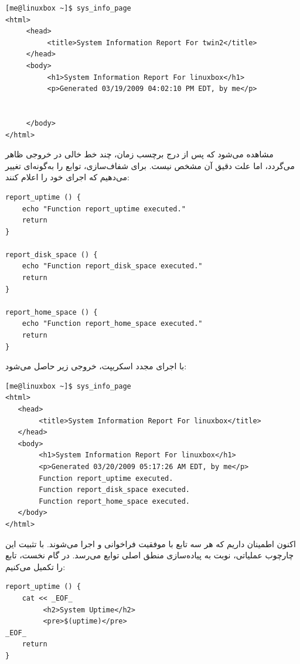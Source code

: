 \begin{latin}
\begin{lstlisting}
[me@linuxbox ~]$ sys_info_page
<html>
     <head>
          <title>System Information Report For twin2</title>
     </head>
     <body>
          <h1>System Information Report For linuxbox</h1>
          <p>Generated 03/19/2009 04:02:10 PM EDT, by me</p>


     </body>
</html>
\end{lstlisting}
\end{latin}

مشاهده می‌شود که پس از درج برچسب زمان، چند خط خالی در خروجی ظاهر می‌گردد، اما علت دقیق آن مشخص نیست. برای شفاف‌سازی، توابع را به‌گونه‌ای تغییر می‌دهیم که اجرای خود را اعلام کنند:

\begin{latin}
\begin{lstlisting}
report_uptime () {
    echo "Function report_uptime executed."
    return
}

report_disk_space () {
    echo "Function report_disk_space executed."
    return
}

report_home_space () {
    echo "Function report_home_space executed."
    return
}
\end{lstlisting}
\end{latin}

با اجرای مجدد اسکریپت، خروجی زیر حاصل می‌شود:

\begin{latin}
\begin{lstlisting}
[me@linuxbox ~]$ sys_info_page
<html>
   <head>
        <title>System Information Report For linuxbox</title>
   </head>
   <body>
        <h1>System Information Report For linuxbox</h1>
        <p>Generated 03/20/2009 05:17:26 AM EDT, by me</p>
        Function report_uptime executed.
        Function report_disk_space executed.
        Function report_home_space executed.
   </body>
</html>
\end{lstlisting}
\end{latin}

اکنون اطمینان داریم که هر سه تابع با موفقیت فراخوانی و اجرا می‌شوند. با تثبیت این چارچوب عملیاتی، نوبت به پیاده‌سازی منطق اصلی توابع می‌رسد. در گام نخست، تابع  را تکمیل می‌کنیم:

\begin{latin}
\begin{lstlisting}
report_uptime () {
    cat << _EOF_
         <h2>System Uptime</h2>
         <pre>$(uptime)</pre>
_EOF_
    return
}
\end{lstlisting}
\end{latin}

